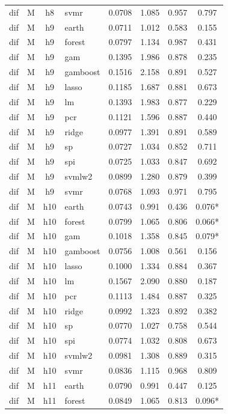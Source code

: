 \begin{ThreePartTable}
\begin{longtable}[t]{llclcccc}
dif & M & h8 & svmr & 0.0708 & 1.085 & 0.957 & 0.797\\
\addlinespace
dif & M & h9 & earth & 0.0711 & 1.012 & 0.583 & 0.155\\
dif & M & h9 & forest & 0.0797 & 1.134 & 0.987 & 0.431\\
dif & M & h9 & gam & 0.1395 & 1.986 & 0.878 & 0.235\\
dif & M & h9 & gamboost & 0.1516 & 2.158 & 0.891 & 0.527\\
dif & M & h9 & lasso & 0.1185 & 1.687 & 0.881 & 0.673\\
dif & M & h9 & lm & 0.1393 & 1.983 & 0.877 & 0.229\\
dif & M & h9 & pcr & 0.1121 & 1.596 & 0.887 & 0.440\\
dif & M & h9 & ridge & 0.0977 & 1.391 & 0.891 & 0.589\\
dif & M & h9 & sp & 0.0727 & 1.034 & 0.852 & 0.711\\
dif & M & h9 & spi & 0.0725 & 1.033 & 0.847 & 0.692\\
dif & M & h9 & svmlw2 & 0.0899 & 1.280 & 0.879 & 0.399\\
dif & M & h9 & svmr & 0.0768 & 1.093 & 0.971 & 0.795\\
\addlinespace
dif & M & h10 & earth & 0.0743 & 0.991 & 0.436 & 0.076*\\
dif & M & h10 & forest & 0.0799 & 1.065 & 0.806 & 0.066*\\
dif & M & h10 & gam & 0.1018 & 1.358 & 0.845 & 0.079*\\
dif & M & h10 & gamboost & 0.0756 & 1.008 & 0.561 & 0.156\\
dif & M & h10 & lasso & 0.1000 & 1.334 & 0.884 & 0.367\\
dif & M & h10 & lm & 0.1567 & 2.090 & 0.880 & 0.187\\
dif & M & h10 & pcr & 0.1113 & 1.484 & 0.887 & 0.325\\
dif & M & h10 & ridge & 0.0992 & 1.323 & 0.892 & 0.382\\
dif & M & h10 & sp & 0.0770 & 1.027 & 0.758 & 0.544\\
dif & M & h10 & spi & 0.0774 & 1.032 & 0.808 & 0.673\\
dif & M & h10 & svmlw2 & 0.0981 & 1.308 & 0.889 & 0.315\\
dif & M & h10 & svmr & 0.0836 & 1.115 & 0.968 & 0.809\\
\addlinespace
dif & M & h11 & earth & 0.0790 & 0.991 & 0.447 & 0.125\\
dif & M & h11 & forest & 0.0849 & 1.065 & 0.813 & 0.096*\\

\end{longtable}
\end{ThreePartTable}
